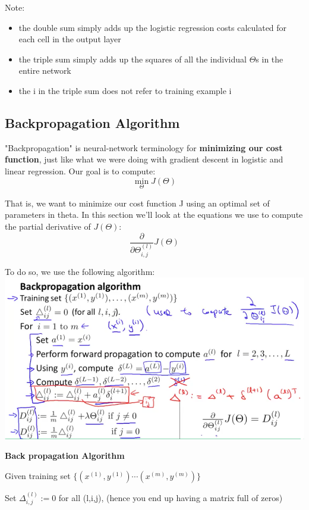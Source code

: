 \documentclass{report}
\begin{document}
Note:
\begin{itemize}
	\item the double sum simply adds up the logistic regression costs calculated for each cell in the output layer
	\item the triple sum simply adds up the squares of all the individual $\Theta$s in the entire network
	\item the i in the triple sum does not refer to training example i
\end{itemize}

\subsection{Backpropagation Algorithm}
"Backpropagation" is neural-network terminology for \textbf{minimizing our cost function}, just like what we were doing with gradient descent in logistic and linear regression. Our goal is to compute:
$$\min_\Theta J(\Theta)$$

That is, we want to minimize our cost function J using an optimal set of parameters in theta. In this section we'll look at the equations we use to compute the partial derivative of $J(\Theta)$:
$$\dfrac{\partial}{\partial \Theta_{i,j}^{(l)}}J(\Theta)$$

To do so, we use the following algorithm:\\
\includegraphics[width=\textwidth]{Backpropagation_Algorithm.png}

\noindent\textbf{Back propagation Algorithm}

Given training set $\lbrace (x^{(1)}, y^{(1)}) \cdots (x^{(m)}, y^{(m)})\rbrace$

Set $\Delta^{(l)}_{i,j} := 0$ for all (l,i,j), (hence you end up having a matrix full of zeros)
\end{document}
